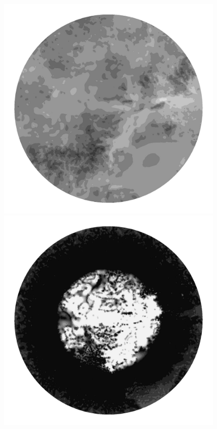 \begin{figure}
  \centering
  
  \begin{minipage}[b]{0.30\linewidth}
    \includegraphics[width=1.0\textwidth]{images/EISMINT_II/U/S_500.jpg}
  \end{minipage}
  \quad
  \begin{minipage}[b]{0.30\linewidth}
    \includegraphics[width=1.0\textwidth]{images/EISMINT_II/U/beta_500.jpg}

\end{minipage}
\end{figure}
